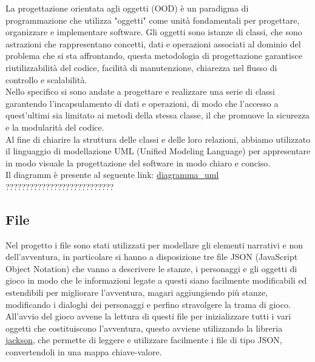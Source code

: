 \documentclass[italian,12pt,a4paper]{article}
\begin{document}
	La progettazione orientata agli oggetti (OOD) è un paradigma di programmazione che utilizza "oggetti" come unità fondamentali per progettare, organizzare e implementare software. Gli oggetti sono istanze di classi, che sono astrazioni che rappresentano concetti, dati e operazioni associati al dominio del problema che si sta affrontando, questa metodologia di progettazione garantisce riutilizzabilità del codice, facilità di manutenzione, chiarezza nel flusso di controllo e scalabilità.\\
	\linebreak
	Nello specifico si sono andate a progettare e realizzare una serie di classi garantendo l'incapsulamento di dati e operazioni, di modo che l'accesso a quest'ultimi sia limitato ai metodi della stessa classe, il che promuove la sicurezza e la modularità del codice.\\
	\linebreak
	Al fine di chiarire la struttura delle classi e delle loro relazioni, abbiamo utilizzato il linguaggio di modellazione UML (Unified Modeling Language) per appresentare in modo visuale la progettazione del software in modo chiaro e conciso.\\
	Il diagramm è presente al seguente link: \href{AGGIUNGERE LINK ALL'IMMAGINE DELL'UML}{diagramma\_uml}  ???????????????????????????

	
	\subsection{File}
	Nel progetto i file sono stati utilizzati per modellare gli elementi narrativi e non dell'avventura, in particolare si hanno a disposizione tre file JSON (JavaScript Object Notation) che vanno a descrivere le stanze, i personaggi e gli oggetti di gioco in modo che le informazioni legate a questi siano facilmente modificabili ed estendibili per migliorare l'avventura, magari aggiungiendo più stanze, modificando i dialoghi dei personaggi e perfino stravolgere la trama di gioco. \\
	\linebreak
	All'avvio del gioco avvene la lettura di questi file per inizializzare tutti i vari oggetti che costituiscono l'avventura, questo avviene utilizzando la libreria \href{https://github.com/FasterXML/jackson}{jackson}, che permette di leggere e utilizzare facilmente i file di tipo JSON, convertendoli in una mappa chiave-valore.
	
\end{document}
